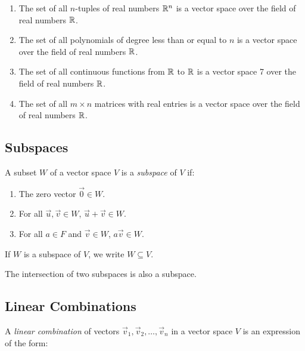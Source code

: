 \begin{enumerate}

	\item The set of all \(n\)-tuples of real numbers \(\mathbb{R}^n\) is a vector space over the field 
	      of real numbers \(\mathbb{R}\).

	\item The set of all polynomials of degree less than or equal to \(n\) is a vector space over the 
	      field of real numbers \(\mathbb{R}\).

	\item The set of all continuous functions from \(\mathbb{R}\) to \(\mathbb{R}\) is a vector space 7
	      over the field of real numbers \(\mathbb{R}\).

	\item The set of all \(m \times n\) matrices with real entries is a vector space over the field of 
	      real numbers \(\mathbb{R}\).

\end{enumerate}

\subsection{Subspaces}

A subset \(W\) of a vector space \(V\) is a \emph{subspace} of \(V\) if:

\begin{enumerate}[label=\Roman*.]

	\item The zero vector \(\vec{0} \in W\).

	\item For all \(\vec{u}, \vec{v} \in W\), \(\vec{u} + \vec{v} \in W\).

	\item For all \(a \in F\) and \(\vec{v} \in W\), \(a\vec{v} \in W\).

\end{enumerate}

If \(W\) is a subspace of \(V\), we write \(W \subseteq V\).

The intersection of two subspaces is also a subspace.

\subsection{Linear Combinations}

A \emph{linear combination} of vectors \(\vec{v}_1, \vec{v}_2, \ldots, \vec{v}_n\) in a vector space 
\(V\) is an expression of the form:

